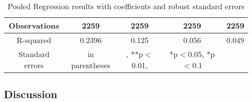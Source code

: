 \begin{table}[ht]
\begin{tabular}{|ccccc|}
Observations & 2259 & 2259 & 2259 & 2259 \\
\hline
R-squared &0.2396 & 0.125 & 0.056 & 0.049 \\
\hline
\footnotesize Standard errors& \footnotesize in parentheses&, \footnotesize***p$<$0.01, &\footnotesize **p$<$0.05, *p$<$0.1\\
\end{tabular}
\caption{Pooled Regression results with coefficients and robust standard errors}
\label{Pooled Regression results with coefficients and robust standard errors}
\end{table}



\subsection{Discussion}

